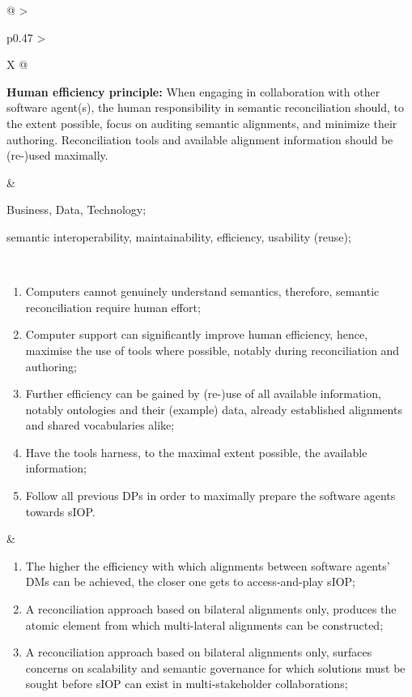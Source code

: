 \begin{xltabular}[l]{\linewidth}{@{} >{\small\raggedright\arraybackslash}p{0.47\linewidth} >{\small\raggedright\arraybackslash}X @{}}
\begin{mmdp}\label{dp:he}{\bfseries Human efficiency principle:}
\quad When engaging in collaboration with other software agent(s), the human responsibility in semantic reconciliation should, to the extent possible, focus on auditing semantic alignments, and minimize their authoring. Reconciliation tools and available alignment information should be (re-)used maximally.\end{mmdp}
&
\begin{description}[labelwidth=3.7cm,leftmargin=3.7cm+1ex,nosep,topsep=2ex,labelsep=1ex,font=\bfseries]
\item[Type of information:] Business, Data, Technology;
\item[Quality attributes:] semantic interoperability, maintainability, efficiency, usability (reuse);
\end{description}
\\
\begin{enumerate}[left=6pt, nosep]
  \item Computers cannot genuinely understand semantics, therefore, semantic reconciliation require human effort;
  \item Computer support can significantly improve human efficiency, hence, maximise the use of tools where possible, notably during reconciliation and authoring;
  \item Further efficiency can be gained by (re-)use of all available information, notably ontologies and their (example) data, already established alignments and shared vocabularies alike;
  \item Have the tools harness, to the maximal extent possible, the available information;
  \item Follow all previous DPs in order to maximally prepare the software agents towards sIOP.
\end{enumerate}
&
\begin{enumerate}[left=10pt, nosep]
  \item The higher the efficiency with which alignments between software agents' DMs can be achieved, the closer one gets to access-and-play sIOP;
  \item A reconciliation approach based on bilateral alignments only, produces the atomic element from which multi-lateral alignments can be constructed;
  \item A reconciliation approach based on bilateral alignments only, surfaces concerns on scalability and semantic governance for which solutions must be sought before sIOP can exist in multi-stakeholder collaborations;

\end{enumerate}
\end{xltabular}
